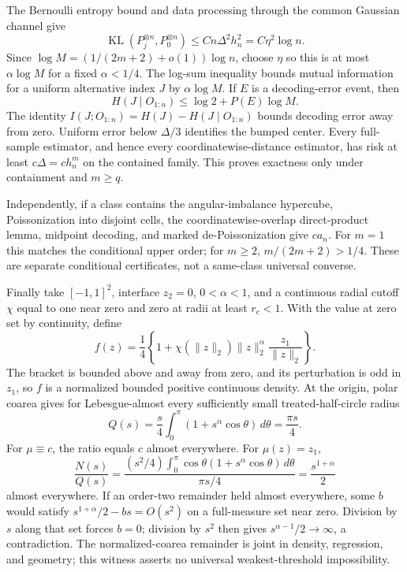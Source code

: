 The Bernoulli entropy bound and data processing through the common Gaussian channel give
\[
 \operatorname{KL}(P_j^{\otimes n},P_0^{\otimes n})
 \leq Cn\Delta^2h_n^2=C\eta^2\log n.
\]
Since \(\log M=(1/(2m+2)+o(1))\log n\), choose \(\eta\) so this is at most \(\alpha\log M\) for a fixed \(\alpha<1/4\).  The log-sum inequality bounds mutual information for a uniform alternative index \(J\) by \(\alpha\log M\).  If \(E\) is a decoding-error event, then
\[
 H(J\mid O_{1:n})\leq\log2+P(E)\log M.
\]
The identity \(I(J;O_{1:n})=H(J)-H(J\mid O_{1:n})\) bounds decoding error away from zero.  Uniform error below \(\Delta/3\) identifies the bumped center.  Every full-sample estimator, and hence every coordinatewise-distance estimator, has risk at least \(c\Delta=ch_n^m\) on the contained family.  This proves exactness only under containment and \(m\geq q\).

Independently, if a class contains the angular-imbalance hypercube, Poissonization into disjoint cells, the coordinatewise-overlap direct-product lemma, midpoint decoding, and marked de-Poissonization give \(ca_n\).  For \(m=1\) this matches the conditional upper order; for \(m\geq2\), \(m/(2m+2)>1/4\).  These are separate conditional certificates, not a same-class universal converse.

Finally take \([-1,1]^2\), interface \(z_2=0\), \(0<\alpha<1\), and a continuous radial cutoff \(\chi\) equal to one near zero and zero at radii at least \(r_c<1\).  With the value at zero set by continuity, define
\[
 f(z)=\frac14\left\{1+\chi(\lVert z\rVert_2)
 \lVert z\rVert_2^\alpha\frac{z_1}{\lVert z\rVert_2}\right\}.
\]
The bracket is bounded above and away from zero, and its perturbation is odd in \(z_1\), so \(f\) is a normalized bounded positive continuous density.  At the origin, polar coarea gives for Lebesgue-almost every sufficiently small treated-half-circle radius
\[
 Q(s)=\frac s4\int_0^\pi(1+s^\alpha\cos\theta)\,d\theta
 =\frac{\pi s}{4}.
\]
For \(\mu\equiv c\), the ratio equals \(c\) almost everywhere.  For \(\mu(z)=z_1\),
\[
 \frac{N(s)}{Q(s)}
 =\frac{(s^2/4)\int_0^\pi\cos\theta(1+s^\alpha\cos\theta)\,d\theta}
 {\pi s/4}=\frac{s^{1+\alpha}}2
\]
almost everywhere.  If an order-two remainder held almost everywhere, some \(b\) would satisfy \(s^{1+\alpha}/2-bs=O(s^2)\) on a full-measure set near zero.  Division by \(s\) along that set forces \(b=0\); division by \(s^2\) then gives \(s^{\alpha-1}/2\to\infty\), a contradiction.  The normalized-coarea remainder is joint in density, regression, and geometry; this witness asserts no universal weakest-threshold impossibility.